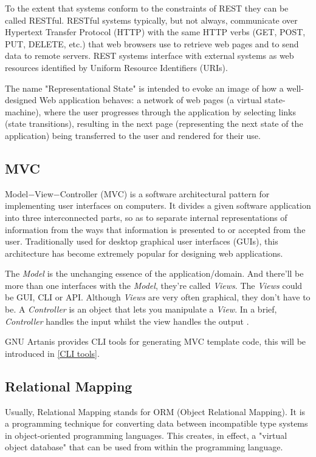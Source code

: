 \documentclass[preprint,numbers,numberedpars,10pt]{sigplanconf}
\begin{document}
To the extent that systems conform to the constraints of REST they can be called RESTful. RESTful systems typically, but not always,
communicate over Hypertext Transfer Protocol (HTTP) with the same HTTP verbs (GET, POST, PUT, DELETE, etc.) that web browsers use to retrieve web
pages and to send data to remote servers. REST systems interface with external systems as web resources identified by Uniform Resource Identifiers
(URIs).

The name "Representational State" is intended to evoke an image of how a well-designed Web application behaves: a network of web pages
(a virtual state-machine), where the user progresses through the application by selecting links (state transitions), resulting in the next page
(representing the next state of the application) being transferred to the user and rendered for their use.



\subsection{MVC}

Model$-$View$-$Controller (MVC) is a software architectural pattern for implementing user interfaces on computers. It divides a given software
application into three interconnected parts, so as to separate internal representations of information from the ways that information is
presented to or accepted from the user. Traditionally used for desktop graphical user interfaces (GUIs), this architecture has become extremely
popular for designing web applications.

The {\it Model} is the unchanging essence of the application/domain. And there'll be more than one interfaces with the {\it Model}, they're called
{\it Views}. The {\it Views} could be GUI, CLI or API. Although {\it Views} are very often graphical, they don’t have to be.
A {\it Controller} is an object that lets you manipulate a {\it View}. In a brief, {\it Controller} handles the input whilst the view handles the
output \citep{deacon2009model}.

GNU Artanis provides CLI tools for generating MVC template code, this will be introduced in \ref{CLI tools}.

\subsection{Relational Mapping}

Usually, Relational Mapping stands for ORM (Object Relational Mapping).
It is a programming technique for converting data between incompatible type systems in object-oriented programming languages.
This creates, in effect, a "virtual object database" that can be used from within the programming language.
\end{document}
